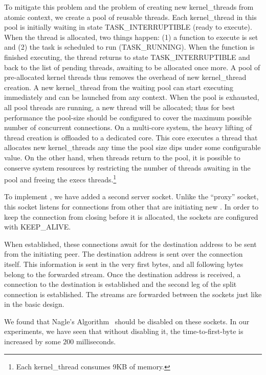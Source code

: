 To mitigate this problem and the problem of creating new kernel\_threads from atomic context, we create a pool of reusable threads. Each kernel\_thread in this pool is initially waiting in state TASK\_INTERRUPTIBLE (ready to execute). When the thread is allocated, two things happen: (1) a function to execute is set and (2)  the task is scheduled to run (TASK\_RUNNING). When the function is finished executing, the thread returns to state TASK\_INTERRUPTIBLE and back to the list of pending threads, awaiting to be allocated once more. A pool of pre-allocated kernel threads thus removes the overhead of new kernel\_thread creation. A new kernel\_thread from the waiting pool can start executing immediately and can be launched from any context. When the pool is exhausted, \ie all pool threads are running, a new thread will be allocated; thus for best performance the pool-size should be configured to cover the maximum possible number of concurrent connections. On a multi-core system, the heavy lifting of thread creation is offloaded to a dedicated core. This core executes a thread that allocates new kernel\_threads any time the pool size dips under some configurable value. On the other hand, when threads return to the pool, it is possible to conserve system resources by restricting the number of threads awaiting in the pool and freeing the execs threads.\footnote{Each kernel\_thread consumes 9KB of memory.}

To implement \reconn, we have added a second server socket. Unlike the ``proxy'' socket, this socket listens for connections from other \proxies that are initiating new \reconn. In order to keep the connection from closing before it is allocated, the sockets are configured with KEEP\_ALIVE.

When established, these connections await for the destination address to be sent from the initiating peer. The destination address is sent over the connection itself. This information is sent in the very first bytes, and all following bytes belong to the forwarded stream. 
Once the destination address is received, a connection to the destination is established and the second leg of the split connection is established. The streams are forwarded between the sockets just like in the basic design.

We found that Nagle's Algorithm~\cite{nagle} should be disabled on these sockets. In our experiments, we have seen that without disabling it, the time-to-first-byte is increased by some $200$ milliseconds.  

